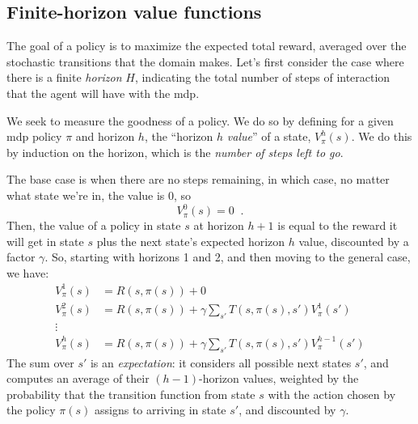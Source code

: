 \subsection{Finite-horizon value functions}
\label{sec-mdp_finite_horizon}

The goal of a policy is to maximize the expected total reward, averaged over
the stochastic transitions that the domain makes.  Let's first
consider the case where there is a finite {\em horizon} $H$,
indicating the total number of steps of interaction that the agent
will have with the {\sc mdp}.

We seek to measure the goodness of a
policy. We do so by defining for a given {\sc mdp} policy $\pi$ and horizon
$h$, the ``horizon $h$ {\em value}'' of a state, $V^{h}_\pi(s)$.  We
do this by induction on the horizon, which is the {\em number of steps
    left to go}.

The base case is when there are no steps remaining, in which case, no
matter what state we're in, the value is 0,  so
\begin{equation}
  V^0_{\pi}(s) = 0\;\;.
  \label{eq:finite_val_0}
\end{equation}
Then, the value of a policy in state $s$ at horizon $h + 1$ is equal
to the reward it will get in state $s$ plus the next state's expected horizon $h$
value, discounted by a factor $\gamma$.  So, starting with horizons 1 and 2, and then
moving to the general case, we have:
\begin{align}
  V^1_{\pi}(s) & = R(s, \pi(s)) + 0                                                     \\
  \label{eq:finite_val_1}
  V^2_{\pi}(s) & = R(s, \pi(s)) +  \gamma \sum_{s'}T(s, \pi(s), s')  V^1_{\pi}(s')      \\
  \vdots
  \nonumber                                                                             \\
  V^h_{\pi}(s) & = R(s, \pi(s)) + \gamma \sum_{s'}T(s, \pi(s), s')  V^{h - 1}_{\pi}(s')
  \label{eq:finite_value}
\end{align}
The sum over $s'$ is an {\em expectation}: it
considers all possible next states $s'$, and computes an average of
their $(h-1)$-horizon values, weighted by the probability that the
transition function from state $s$ with the action chosen by the
policy $\pi(s)$ assigns to arriving in state $s'$, and discounted by $\gamma$.

